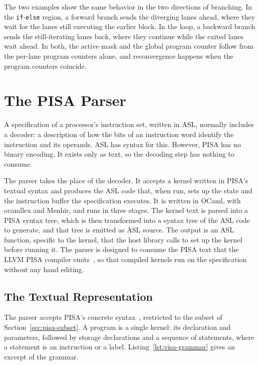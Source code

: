 The two examples show the same behavior in the two directions of
branching. In the \texttt{if}-\texttt{else} region, a forward branch sends
the diverging lanes ahead, where they wait for the lanes still executing
the earlier block. In the loop, a backward branch sends the still-iterating
lanes back, where they continue while the exited lanes wait ahead. In
both, the active mask and the global program counter follow from the
per-lane program counters alone, and reconvergence happens when the
program counters coincide.

\newpage
\section{The PISA Parser}
\label{sec:parser}

A specification of a processor's instruction set, written in ASL, normally
includes a decoder: a description of how the bits of an instruction word
identify the instruction and its operands. ASL has syntax for this. However, 
PISA has no binary encoding. It exists only as text, so the
decoding step has nothing to consume.

The parser takes the place of the decoder. It accepts a kernel written in
PISA's textual syntax and produces the ASL code that, when run, sets up the
state and the instruction buffer the specification executes. It is written 
in OCaml, with ocamllex and Menhir, and runs in three
stages. The kernel text is parsed into a PISA syntax tree, which is then
transformed into a syntax tree of the ASL code to generate, and that tree
is emitted as ASL source. The output is an ASL function, specific to the kernel, that the
host library calls to set up the kernel before running it.
The parser is designed to consume the PISA text that the LLVM PISA
compiler emits~\cite{pisa-llvm-rfc}, so that compiled kernels run on the
specification without any hand editing.

\subsection{The Textual Representation}
\label{sec:parser-syntax}

The parser accepts PISA's concrete syntax~\cite{pisa-spec}, restricted to
the subset of Section~\ref{sec:pisa-subset}. A program is a single kernel:
its declaration and parameters, followed by storage declarations and a
sequence of statements, where a statement is an instruction or a label.
Listing~\ref{lst:visa-grammar} gives an excerpt of the grammar.

